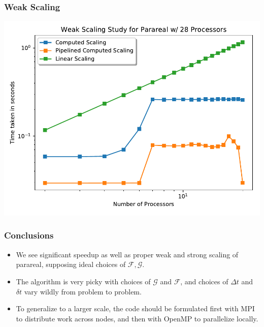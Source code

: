 \documentclass[pdf,12pt]{beamer}
\begin{document}
\begin{frame}
  \frametitle{Weak Scaling}
  \begin{center}
    \includegraphics[width=.8\textwidth]{./resources/weak_scaling}
  \end{center}
\end{frame}

\begin{frame}
  \frametitle{Conclusions}
  \begin{itemize}
    \item <1-> We see significant speedup as well as proper weak and strong
      scaling of parareal, supposing ideal choices of $\mathcal{F},
      \mathcal{G}$.
    \item <2-> The algorithm is very picky with choices of $\mathcal{G}$ and
      $\mathcal{F}$, and choices of $\Delta t$ and $\delta t$ vary wildly from
      problem to problem.
    \item <3-> To generalize to a larger scale, the code should be formulated
      first with MPI to distribute work across nodes, and then with OpenMP to
      parallelize locally.
  \end{itemize}
\end{frame}
\end{document}
